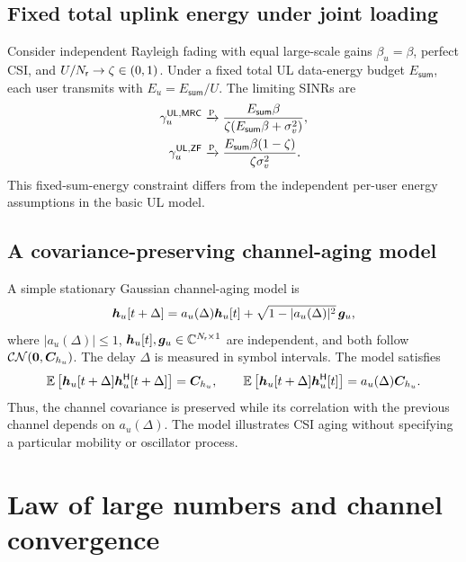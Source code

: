 \subsection{Fixed total uplink energy under joint loading}
Consider independent Rayleigh fading with equal large-scale gains $\beta_u=\beta$, perfect CSI, and $U/N_{\mathsf{r}}\to\zeta\in(0,1)$. Under a fixed total UL data-energy budget $E_{\mathsf{sum}}$, each user transmits with $E_u=E_{\mathsf{sum}}/U$. The limiting SINRs are
\begin{equation}
	\begin{split}
		\gamma_u^{\mathsf{UL},\mathsf{MRC}}
		&\xrightarrow{\mathrm p}
		\frac{E_{\mathsf{sum}}\beta}
		{\zeta(E_{\mathsf{sum}}\beta+\sigma_v^2)},\\
		\gamma_u^{\mathsf{UL},\mathsf{ZF}}
		&\xrightarrow{\mathrm p}
		\frac{E_{\mathsf{sum}}\beta(1-\zeta)}
		{\zeta\sigma_v^2}.
	\end{split}
\end{equation}
This fixed-sum-energy constraint differs from the independent per-user energy assumptions in the basic UL model.

\subsection{A covariance-preserving channel-aging model}
A simple stationary Gaussian channel-aging model is
\begin{equation}
	\bm{h}_u[t+\Delta]
	=a_u(\Delta)\bm{h}_u[t]
	+\sqrt{1-|a_u(\Delta)|^2}\,\bm{g}_u,
\end{equation}
where $|a_u(\Delta)|\leq1$, $\bm{h}_u[t],\bm{g}_u\in\mathbb{C}^{N_{\mathsf{r}}\times1}$ are independent, and both follow $\mathcal{CN}(\bm{0},\bm{C}_{h_u})$. The delay $\Delta$ is measured in symbol intervals. The model satisfies
\begin{equation*}
	\mathbb{E}\left[\bm{h}_u[t+\Delta]{\bm{h}}^{\mathsf{H}}_u[t+\Delta]\right]
	=\bm{C}_{h_u},
	\qquad
	\mathbb{E}\left[\bm{h}_u[t+\Delta]{\bm{h}}^{\mathsf{H}}_u[t]\right]
	=a_u(\Delta)\bm{C}_{h_u}.
\end{equation*}
Thus, the channel covariance is preserved while its correlation with the previous channel depends on $a_u(\Delta)$. The model illustrates CSI aging without specifying a particular mobility or oscillator process.


\section{Law of large numbers and channel convergence}
\label{app:lln-05}


